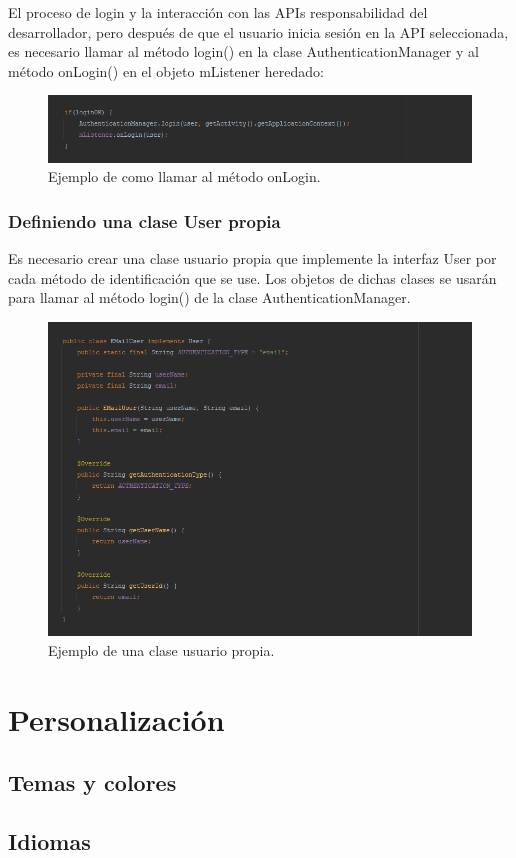 El proceso de login y la interacción con las APIs responsabilidad del desarrollador, pero después de que el usuario inicia sesión en la API seleccionada, es necesario llamar al método login() en la clase AuthenticationManager y al método onLogin() en el objeto mListener heredado:

\begin{figure}[H]
  \centering
    \includegraphics[scale=0.6]{50-anexos/B-uso/identificacion_loginOk.png} 
    \caption{Ejemplo de como llamar al método onLogin.}
\end{figure}	



\subsubsection{Definiendo una clase User propia}

Es necesario crear una clase usuario propia que implemente la interfaz User por cada método de identificación que se use. Los objetos de dichas clases se usarán para llamar al método login() de la clase AuthenticationManager.

\begin{figure}[H]
  \centering
    \includegraphics[scale=0.6]{50-anexos/B-uso/identificacion_user_propio.png} 
    \caption{Ejemplo de una clase usuario propia.}
\end{figure}	






\section{Personalización}

\subsection{Temas y colores}

\subsection{Idiomas}



